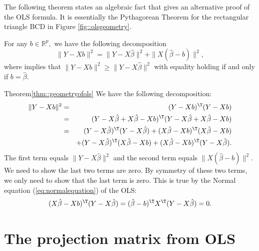 The following theorem states an algebraic fact that gives an alternative proof of the OLS formula. It is essentially the Pythagorean Theorem for the rectangular
triangle BCD in Figure \ref{fig::olsgeometry}. 

\begin{theorem}\label{thm::geometryofols}
For any $b\in\mathbb{R}^{p},$ we have the following decomposition
\[
\|Y-Xb\|^{2}=\|Y-X\hat{\beta}\|^{2}+\|X(\hat{\beta}-b)\|^{2},
\]
where implies that $\|Y-Xb\|^{2}\geq\|Y-X\hat{\beta}\|^{2}$ with
equality holding if and only if $b=\hat{\beta}.$
\end{theorem}
\begin{myproof}{Theorem}{\ref{thm::geometryofols}}
We have the following decomposition: 
\begin{eqnarray*}
\|Y-Xb\|^{2} 
& =& (Y-Xb)^{\T}(Y-Xb)\\
 & =& (Y-X\hat{\beta}+X\hat{\beta}-Xb)^{\T}(Y-X\hat{\beta}+X\hat{\beta}-Xb)\\
 & =& (Y-X\hat{\beta})^{\T}(Y-X\hat{\beta})+(X\hat{\beta}-Xb)^{\T}(X\hat{\beta}-Xb)\\
 & & +(Y-X\hat{\beta})^{\T}(X\hat{\beta}-Xb)+(X\hat{\beta}-Xb)^{\T}(Y-X\hat{\beta}).
\end{eqnarray*}
The first term equals $\|Y-X\hat{\beta}\|^{2}$ and the second term equals $\|X(\hat{\beta}-b)\|^{2}$. 
We need to show the last two terms are zero. By symmetry of these
two terms, we only need to show that the last term is zero. This is
true by the Normal equation (\ref{eq:normalequation}) of the OLS:
\begin{align*}
(X\hat{\beta}-Xb)^{\T}(Y-X\hat{\beta}) & =(\hat{\beta}-b)^{\T}X^{\T}(Y-X\hat{\beta})=0.\\
\end{align*}
\end{myproof}



 
 


\section{The projection matrix from OLS}

